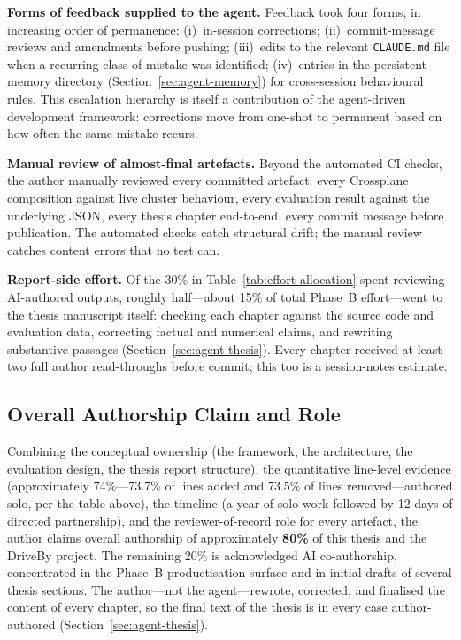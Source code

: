 \textbf{Forms of feedback supplied to the agent.} Feedback took four forms, in increasing order of permanence: (i)~in-session corrections; (ii)~commit-message reviews and amendments before pushing; (iii)~edits to the relevant \texttt{CLAUDE.md} file when a recurring class of mistake was identified; (iv)~entries in the persistent-memory directory (Section~\ref{sec:agent-memory}) for cross-session behavioural rules. This escalation hierarchy is itself a contribution of the agent-driven development framework: corrections move from one-shot to permanent based on how often the same mistake recurs.

\textbf{Manual review of almost-final artefacts.} Beyond the automated CI checks, the author manually reviewed every committed artefact: every Crossplane composition against live cluster behaviour, every evaluation result against the underlying JSON, every thesis chapter end-to-end, every commit message before publication. The automated checks catch structural drift; the manual review catches content errors that no test can.

\textbf{Report-side effort.} Of the 30\% in Table~\ref{tab:effort-allocation} spent reviewing AI-authored outputs, roughly half---about 15\% of total Phase~B effort---went to the thesis manuscript itself: checking each chapter against the source code and evaluation data, correcting factual and numerical claims, and rewriting substantive passages (Section~\ref{sec:agent-thesis}). Every chapter received at least two full author read-throughs before commit; this too is a session-notes estimate.

\subsection{Overall Authorship Claim and Role}
\label{subsec:authorship-claim}

Combining the conceptual ownership (the framework, the architecture, the evaluation design, the thesis report structure), the quantitative line-level evidence (approximately 74\%---73.7\% of lines added and 73.5\% of lines removed---authored solo, per the table above), the timeline (a year of solo work followed by 12 days of directed partnership), and the reviewer-of-record role for every artefact, the author claims overall authorship of approximately \textbf{80\%} of this thesis and the DriveBy project. The remaining 20\% is acknowledged AI co-authorship, concentrated in the Phase~B productisation surface and in initial drafts of several thesis sections. The author---not the agent---rewrote, corrected, and finalised the content of every chapter, so the final text of the thesis is in every case author-authored (Section~\ref{sec:agent-thesis}).

